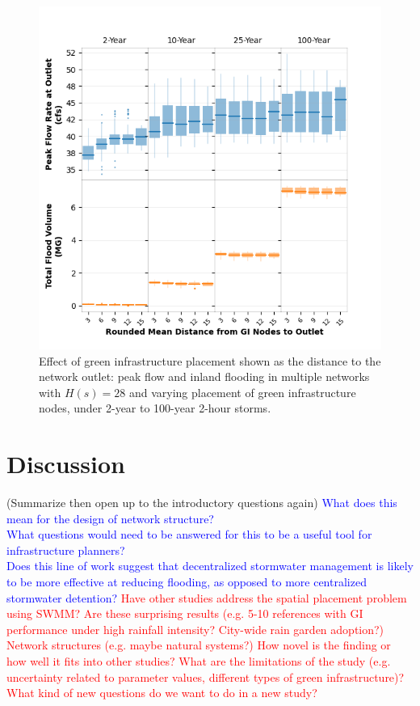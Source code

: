 \documentclass[draft]{agujournal2019}
\begin{document}
 \begin{figure}
 \noindent\includegraphics[width=\textwidth]{GI_placement28_new_rainfalls.png}
\caption{Effect of green infrastructure placement shown as the distance to the network outlet: peak flow and inland flooding in multiple networks with $H(s) = 28$ and varying placement of green infrastructure nodes, under 2-year to 100-year 2-hour storms. }
\label{fig:distance}
\end{figure}

\newpage
\section{Discussion} (Summarize then open up to the introductory questions again)
\textcolor{blue}{What does this mean for the design of network structure?}\\
\textcolor{blue}{What questions would need to be answered for this to be a useful tool for infrastructure planners?}\\
\textcolor{blue}{Does this line of work suggest that decentralized stormwater management is likely to be more effective at reducing flooding, as opposed to more centralized stormwater detention?}
\textcolor{red}{Have other studies address the spatial placement problem using SWMM? Are these surprising results (e.g. 5-10 references with GI performance under high rainfall intensity? City-wide rain garden adoption?) Network structures (e.g. maybe natural systems?) How novel is the finding or how well it fits into other studies? What are the limitations of the study (e.g. uncertainty related to parameter values, different types of green infrastructure)? What kind of new questions do we want to do in a new study?}\\
\end{document}
